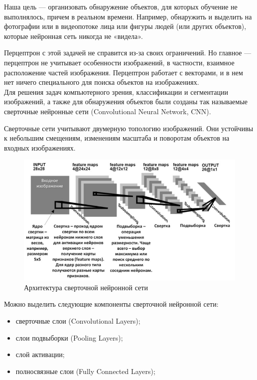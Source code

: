 Наша цель — организовать обнаружение объектов, для которых обучение не выполнялось, причем в реальном времени. Например, обнаружить и выделить на фотографии или в видеопотоке лица или фигуры людей (или других объектов), которые нейронная сеть никогда не «видела».

Перцептрон с этой задачей не справится из-за своих ограничений. Но главное — перцептрон не учитывает особенности изображений, в частности, взаимное расположение частей изображения. Перцептрон работает с векторами, и в нем нет ничего специального для поиска объектов на изображениях.\\

Для решения задач компьютерного зрения, классификации и сегментации изображений, а также для обнаружения объектов были созданы так называемые сверточные нейронные сети (Convolutional Neural Network, CNN).

Сверточные сети учитывают двумерную топологию изображений. Они устойчивы к небольшим смещениям, изменениям масштаба и поворотам объектов на входных изображениях.\\

\begin{figure}[H]
    \centering
    \includegraphics[width = 12cm]{cnn.jpg}
    \caption{Архитектура сверточной нейронной сети}
    \label{cnn}
\end{figure}

Можно выделить следующие компоненты сверточной нейронной сети:
\begin{itemize}
    \item сверточные слои (Convolutional Layers);
    \item слои подвыборки (Pooling Layers);
    \item слой активации;
    \item полносвязные слои (Fully Connected Layers);
\end{itemize}

